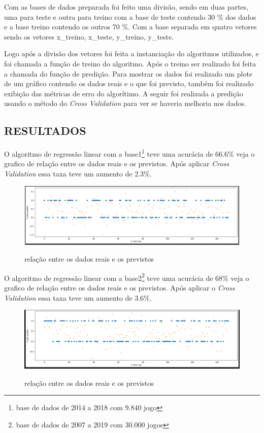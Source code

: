 Com as bases de dados preparada foi feito uma divisão, sendo em duas partes, uma para teste e outra para treino com a base de teste contendo 30 \% dos dados e a base treino contendo os outros 70 \%. Com a base separada em quatro vetores sendo os vetores x\_treino, x\_teste, y\_treino, y\_teste.

Logo após a divisão dos vetores foi feita a instanciação do algoritmos utilizados, e foi chamada a função de treino do algoritmo. Após o treino ser realizado foi feita a chamada do função de predição. Para mostrar os dados foi realizado um plote de um gráfico contendo os dados reais e o que foi previsto, também foi realizado exibição das métricas de erro do algorítimo. A seguir foi realizada a predição usando o método do \textit{Cross Validation} para ver se haveria melhoria nos dados.

\subsection{RESULTADOS} 

O algoritmo de regressão linear com a base1\footnote[4]{base de dados de 2014 a 2018 com 9.840 jogo} teve uma acurácia de 66.6\% veja o grafico de relação entre os dados reais e os previstos. Após aplicar \textit{Cross Validation} essa taxa teve um aumento de 2.3\%.
\begin{figure}[htbp]
	\begin{center}
		\includegraphics[width=0.85\linewidth]{imagens/regressailinear.png}\\
	\end{center}
	\caption[relação entre os dados reais e os previstos]{relação entre os dados reais e os previstos}
	\label{fig:logo}
\end{figure}

O algoritmo de regressão linear com a base2\footnote[5]{base de dados de 2007 a 2019 com 30.000 jogos} teve uma acurácia de 68\% veja o grafico de relação entre os dados reais e os previstos. Após aplicar o \textit{Cross Validation} essa taxa teve um aumento de 3.6\%.
\begin{figure}[htbp]
	\begin{center}
		\includegraphics[width=0.85\linewidth]{imagens/regressailinearAPI.png}\\
	\end{center}
	\caption[relação entre os dados reais e os previstos]{relação entre os dados reais e os previstos}
	\label{fig:logo}
\end{figure}

